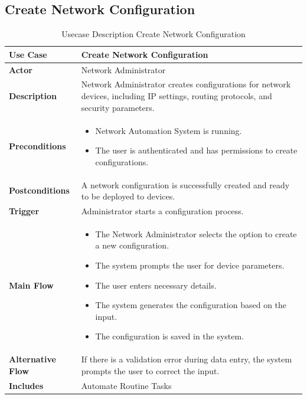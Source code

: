 \subsection{Create Network Configuration}


\begin{table}[H]
    \centering
    \caption{Usecase Description Create Network Configuration}
    \renewcommand{\arraystretch}{1.3}
    \begin{tabular}{|p{3cm}|p{11cm}|}
        \hline
        \textbf{Use Case} & \textbf{Create Network Configuration} \\
        \hline
        \textbf{Actor} & Network Administrator \\
        \hline
        \textbf{Description} & Network Administrator creates configurations for network devices, including IP settings, routing protocols, and security parameters. \\
        \hline
        \textbf{Preconditions} & 
        \begin{itemize}
            \item Network Automation System is running.
            \item The user is authenticated and has permissions to create configurations.
        \end{itemize} \\
        \hline
        \textbf{Postconditions} & A network configuration is successfully created and ready to be deployed to devices. \\
        \hline
        \textbf{Trigger} & Administrator starts a configuration process. \\
        \hline
        \textbf{Main Flow} & 
        \begin{itemize}
            \item The Network Administrator selects the option to create a new configuration.
            \item The system prompts the user for device parameters.
            \item The user enters necessary details.
            \item The system generates the configuration based on the input.
            \item The configuration is saved in the system.
        \end{itemize} \\
        \hline
        \textbf{Alternative Flow} & If there is a validation error during data entry, the system prompts the user to correct the input. \\
        \hline
        \textbf{Includes} & Automate Routine Tasks \\
        \hline
    \end{tabular}
\end{table}

